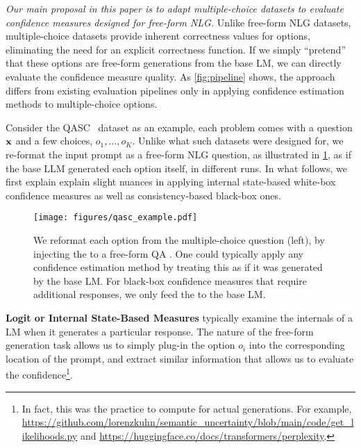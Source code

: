 \textit{Our main proposal in this paper is to adapt multiple-choice datasets to evaluate confidence measures designed for free-form NLG.}
Unlike free-form NLG datasets, multiple-choice datasets provide inherent correctness values for options, eliminating the need for an explicit correctness function. 
If we simply ``pretend'' that these options are free-form generations from the base LM, we can directly evaluate the confidence measure quality. 
As \cref{fig:pipeline} shows, the approach differs from existing evaluation pipelines only in applying confidence estimation methods to multiple-choice options.




Consider the QASC~\cite{khot2020qasc} dataset as an example,
each problem comes with a question $\mathbf{x}$ and a few choices, $o_1,\ldots,o_K$. 
Unlike what such datasets were designed for, we re-format the input prompt as a free-form NLG question, as illustrated in \cref{fig:qasc_example}, as if the base LLM generated each option itself, in different runs.
In what follows, we first explain explain slight nuances in applying internal state-based white-box confidence measures as well as consistency-based black-box ones. 

\begin{figure}[t]
  \texttt{[image: figures/qasc\_example.pdf]}
  \caption{
  We reformat each option from the multiple-choice question (left), by injecting the  to a free-form QA .
  One could typically apply any confidence estimation method by treating this  as if it was generated by the base LM.
  For black-box confidence measures that require additional responses, we only feed the  to the base LM.
  }
  \label{fig:qasc_example}
\vspace{-3mm}
\end{figure}



\textbf{Logit or Internal State-Based Measures} typically examine the internals of a LM when it generates a particular response.
The nature of the free-form generation task allows us to simply plug-in the option $o_i$ into the corresponding location of the prompt, and extract similar information that allows us to evaluate the confidence\footnote{In fact, this was the practice to compute \baselineSL for actual generations. For example, \url{https://github.com/lorenzkuhn/semantic_uncertainty/blob/main/code/get_likelihoods.py} and \url{https://huggingface.co/docs/transformers/perplexity}.}.

